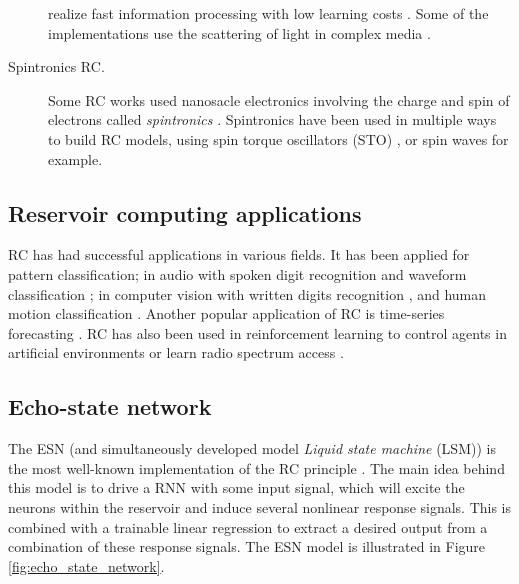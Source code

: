 \begin{description}
        realize fast information processing with low
        learning costs \parencite{paquotOptoelectronicReservoirComputing2012,
        martinenghiPhotonicNonlinearTransient2012,
        suganoReservoirComputingUsing2020, antonikHumanActionRecognition2019}.
        Some of the implementations use the scattering of light in complex media
        \parencite{dongOpticalReservoirComputing2020,
        rafayelyanLargeScaleOpticalReservoir2020}.
  \item[Spintronics \ac{RC}.] Some \ac{RC} works used nanosacle electronics
        involving the charge and spin of electrons called \emph{spintronics}
        \parencite{wolfSpintronicsSpinBasedElectronics2001}. Spintronics have
        been used in multiple ways to build \ac{RC} models, using spin torque
        oscillators (STO)
        \parencite{torrejonNeuromorphicComputingNanoscale2017,
        williameChaoticDynamicsMacrospin2019}, or spin waves
        \parencite{nakaneReservoirComputingSpin2018} for example.
\end{description}

\subsection{Reservoir computing applications}

\ac{RC} has had successful applications in various fields. It has been applied
for pattern classification; in audio with spoken digit recognition
\parencite{verstraetenIsolatedWordRecognition2005} and waveform classification
\parencite{paquotOptoelectronicReservoirComputing2012}; in computer vision with
written digits recognition \parencite{jalalvandRealTimeReservoirComputing2015},
and human motion classification \parencite{sohIterativeTemporalLearning2012,
  antonikHumanActionRecognition2019}. Another popular application of \ac{RC} is
time-series forecasting \parencite{jaegerEchoStateApproach2001,
  jaegerAdaptiveNonlinearSystem2002, wyffelsComparativeStudyReservoir2010}.
\ac{RC} has also been used in reinforcement learning to control agents in
artificial environments \parencite{kannoPhotonicReinforcementLearning2022} or
learn radio spectrum access \parencite{changDistributiveDynamicSpectrum2019}.

\subsection{Echo-state network}

The \acf{ESN} (and simultaneously developed model \emph{Liquid state machine}
(LSM)) is the most well-known implementation of the \ac{RC} principle
\parencite{tanakaRecentAdvancesPhysical2019}. The main idea behind this model is
to drive a \ac{RNN} with some input signal, which will excite the neurons within
the reservoir and induce several nonlinear response signals. This is combined
with a trainable linear regression to extract a desired output from a
combination of these response signals. The \ac{ESN} model is illustrated in 
Figure \ref{fig:echo_state_network}.


